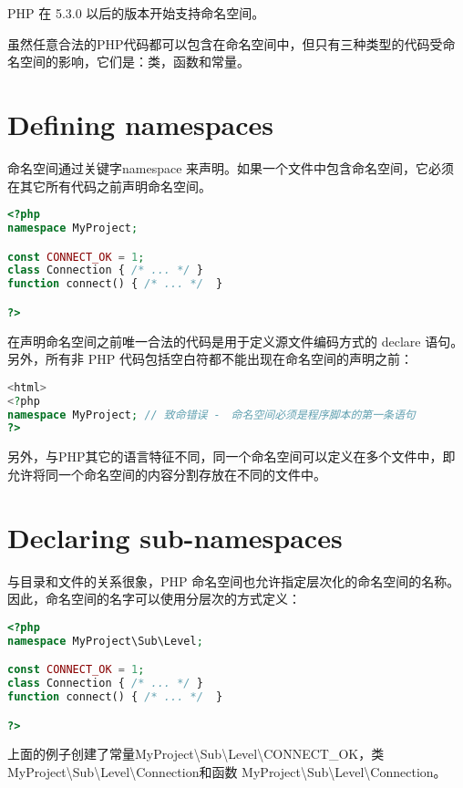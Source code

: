 PHP 在 5.3.0 以后的版本开始支持命名空间。




虽然任意合法的PHP代码都可以包含在命名空间中，但只有三种类型的代码受命名空间的影响，它们是：类，函数和常量。


\chapter{Defining namespaces}

命名空间通过关键字namespace 来声明。如果一个文件中包含命名空间，它必须在其它所有代码之前声明命名空间。


\begin{lstlisting}[language=PHP]
<?php
namespace MyProject;

const CONNECT_OK = 1;
class Connection { /* ... */ }
function connect() { /* ... */  }

?>
\end{lstlisting}


在声明命名空间之前唯一合法的代码是用于定义源文件编码方式的 declare 语句。另外，所有非 PHP 代码包括空白符都不能出现在命名空间的声明之前：

\begin{lstlisting}[language=PHP]
<html>
<?php
namespace MyProject; // 致命错误 -　命名空间必须是程序脚本的第一条语句
?>
\end{lstlisting}


另外，与PHP其它的语言特征不同，同一个命名空间可以定义在多个文件中，即允许将同一个命名空间的内容分割存放在不同的文件中。


\chapter{Declaring sub-namespaces}


与目录和文件的关系很象，PHP 命名空间也允许指定层次化的命名空间的名称。因此，命名空间的名字可以使用分层次的方式定义：


\begin{lstlisting}[language=PHP]
<?php
namespace MyProject\Sub\Level;

const CONNECT_OK = 1;
class Connection { /* ... */ }
function connect() { /* ... */  }

?>
\end{lstlisting}



上面的例子创建了常量MyProject\textbackslash Sub\textbackslash Level\textbackslash CONNECT\_OK，类 MyProject\textbackslash Sub\textbackslash Level\textbackslash Connection和函数 MyProject\textbackslash Sub\textbackslash Level\textbackslash Connection。

